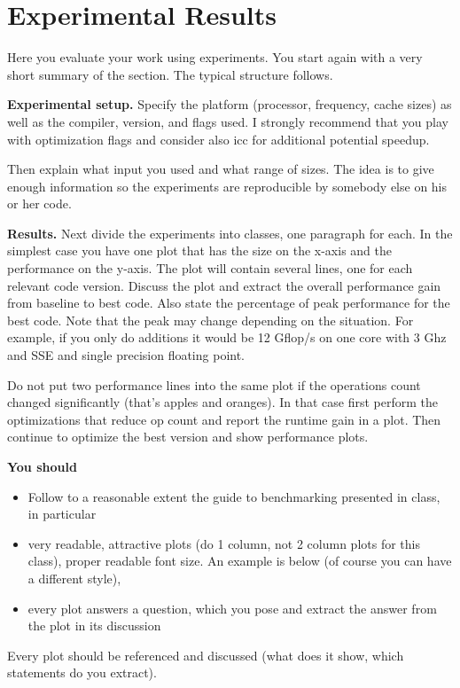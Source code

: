 \documentclass[letterpaper]{article}
\newcommand{\mypar}[1]{{\bf #1.}}
\begin{document}
\section{Experimental Results}\label{sec:exp}

Here you evaluate your work using experiments. You start again with a
very short summary of the section. The typical structure follows.

\mypar{Experimental setup} Specify the platform (processor, frequency, cache sizes)
as well as the compiler, version, and flags used. I strongly recommend that you play with optimization flags and consider also icc for additional potential speedup.

Then explain what input you used and what range of sizes. The idea is to give enough information so the experiments are reproducible by somebody else on his or her code.

\mypar{Results}
Next divide the experiments into classes, one paragraph for each. In the simplest case you have one plot that has the size on the x-axis and the performance on the y-axis. The plot will contain several lines, one for each relevant code version. Discuss the plot and extract the overall performance gain from baseline to best code. Also state the percentage of peak performance for the best code. Note that the peak may change depending on the situation. For example, if you only do additions it would be 12 Gflop/s
on one core with 3 Ghz and SSE and single precision floating point.

Do not put two performance lines into the same plot if the operations count changed significantly (that's apples and oranges). In that case first perform the optimizations that reduce op count and report the runtime gain in a plot. Then continue to optimize the best version and show performance plots.

{\bf You should}
\begin{itemize}
\item Follow to a reasonable extent the guide to benchmarking presented in class, in particular
\item very readable, attractive plots (do 1 column, not 2 column plots
for this class), proper readable font size. An example is below (of course you can have a different style),
\item every plot answers a question, which you pose and extract the
answer from the plot in its discussion
\end{itemize}
Every plot should be referenced and discussed (what does it show, which statements do
you extract).
\end{document}

